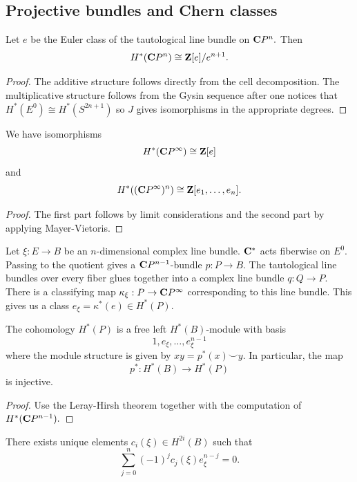 \documentclass[a4paper,openany]{scrbook}
\begin{document}
\subsection{Projective bundles and Chern classes}


\begin{lemma}
Let $e$ be the Euler class of the tautological line bundle on $\mathbf C P^n.$ Then $$H^*(\mathbf C P^n)\cong \mathbf Z [e]/e^{n+1}.$$
\end{lemma}

\begin{proof}
The additive structure follows directly from the cell decomposition. The multiplicative structure follows from the Gysin sequence after one notices that $H^*(E^0)\cong H^*(S^{2n+1})$ so $J$ gives isomorphisms in the appropriate degrees.
\end{proof}

\begin{corollary}
We have isomorphisms $$H^*(\mathbf C P^\infty)\cong \mathbf Z[e]$$ and $$H^*((\mathbf C P^\infty)^n)\cong \mathbf Z[e_1,\dots,e_n].$$
\end{corollary}

\begin{proof}
The first part follows by limit considerations and the second part by applying Mayer-Vietoris.
\end{proof}


Let $\xi:E\rightarrow B$ be an $n$-dimensional complex line bundle. $\mathbf C^*$ acts fiberwise on $E^0.$ Passing to the quotient gives a $\mathbf C P^{n-1}$-bundle $p:P\rightarrow B.$ The tautological line bundles over every fiber glues together into a complex line bundle $q:Q\rightarrow P.$ There is a classifying map $\kappa_\xi:P\rightarrow \mathbf C P^\infty$ corresponding to this line bundle. This gives us a class $e_\xi =\kappa^*(e)\in H^*(P).$


\begin{lemma} \label{lemma:projectivebundlecohomology}
The cohomology $H^*(P)$ is a free left $H^*(B)$-module with basis $$1,e_\xi,\dots,e_\xi^{n-1}$$ where the module structure is given by $xy=p^*(x)\smile y.$ In particular, the map $$p^*:H^*(B)\rightarrow H^*(P)$$ is injective.
\end{lemma}

\begin{proof}
Use the Leray-Hirsh theorem together with the computation of $H^*(\mathbf C P^{n-1}).$
\end{proof}

\begin{lemma}
There exists unique elements $c_i(\xi)\in H^{2i}(B)$ such that $$\sum_{j=0}^n(-1)^jc_j(\xi)e_\xi^{n-j}=0.$$
\end{lemma}
\end{document}
